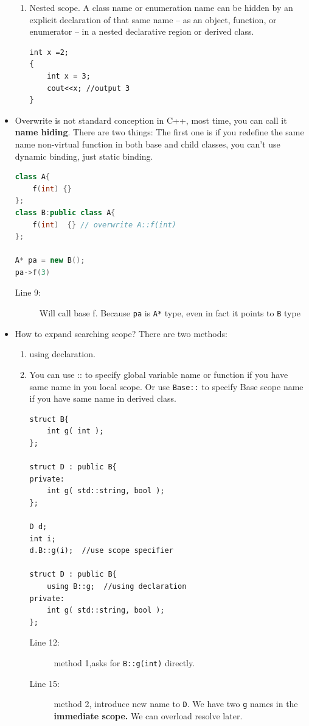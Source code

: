 \documentclass[a4paper,11pt,twoside]{book}
\begin{document}
\begin{itemize}
\begin{enumerate}
		\item Nested scope. A class name or enumeration name can be hidden by an explicit declaration of that same name -- as an object, function, or enumerator -- in a nested declarative region or derived class.
\begin{lstlisting}[numbers=none]
int x =2;
{
	int x = 3; 
	cout<<x; //output 3
}
\end{lstlisting}
		
	\end{enumerate}
	
	\item Overwrite is not standard conception in C++, most time, you can call it \textbf{name hiding}. There are two things: The first one is if you redefine the same name non-virtual function in both base and child classes, you can't use dynamic binding, just static binding. 
\begin{lstlisting}[frame=single, language=c++]
class A{
	f(int) {}
};
class B:public class A{
	f(int)  {} // overwrite A::f(int)
};
	
A* pa = new B();
pa->f(3) 
\end{lstlisting}
\begin{description}
	\item[Line 9:] Will call base f. Because \texttt{pa} is \texttt{A*} type, even in fact it points to \texttt{B} type
\end{description}


	
	\item How to expand searching scope?  There are two methods:
	\begin{enumerate}
		\item using declaration.
		
		\item You can use :: to specify global variable name or function if you have same name in you local scope.  Or use \texttt{Base::} to specify Base scope name if you have same name in derived class.
\begin{lstlisting}
struct B{
	int g( int );
};

struct D : public B{
private:
	int g( std::string, bool );
};

D d; 
int i;
d.B::g(i);  //use scope specifier 
		
struct D : public B{ 
	using B::g;  //using declaration
private:
	int g( std::string, bool );
};
\end{lstlisting}
\begin{description}
	\item[Line 12:] method 1,asks for \texttt{B::g(int)} directly.
	\item[Line 15:] method 2, introduce new name to \texttt{D}. We have two \texttt{g} names in the \textbf{immediate scope.} We can overload resolve later.
\end{description}
		

\end{enumerate}
\end{itemize}
\end{document}
